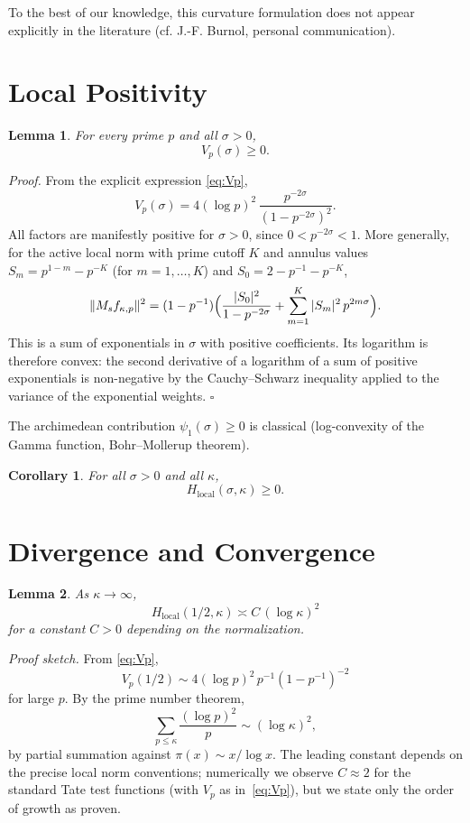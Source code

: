 \documentclass[11pt]{article}
\newtheorem*{lemma*}{Lemma}
\newtheorem*{corollary*}{Corollary}
\begin{document}
To the best of our knowledge, this curvature formulation does not appear explicitly in the literature (cf. J.-F. Burnol, personal communication).

\section{Local Positivity}

\begin{lemma*}
For every prime $p$ and all $\sigma>0$,
\[
V_p(\sigma)\ge 0.
\]
\end{lemma*}

\textit{Proof.} From the explicit expression \eqref{eq:Vp},
\[
V_p(\sigma)=4(\log p)^2\,\frac{p^{-2\sigma}}{(1-p^{-2\sigma})^2}.
\]
All factors are manifestly positive for $\sigma>0$, since $0<p^{-2\sigma}<1$. More generally, for the active local norm with prime cutoff $K$ and annulus values $S_m = p^{1-m}-p^{-K}$ (for $m=1,\ldots,K$) and $S_0 = 2-p^{-1}-p^{-K}$,
\[
\|M_s f_{\kappa,p}\|^2 = (1-p^{-1})\Bigl(\frac{|S_0|^2}{1-p^{-2\sigma}}+\sum_{m=1}^{K}|S_m|^2\,p^{2m\sigma}\Bigr).
\]
This is a sum of exponentials in $\sigma$ with positive coefficients. Its logarithm is therefore convex: the second derivative of a logarithm of a sum of positive exponentials is non-negative by the Cauchy--Schwarz inequality applied to the variance of the exponential weights. \hfill$\square$

The archimedean contribution $\psi_1(\sigma)\ge 0$ is classical (log-convexity of the Gamma function, Bohr--Mollerup theorem).

\begin{corollary*}
For all $\sigma>0$ and all $\kappa$,
\[
H_{\mathrm{local}}(\sigma,\kappa)\ge 0.
\]
\end{corollary*}

\section{Divergence and Convergence}

\begin{lemma*}
As $\kappa\to\infty$,
\[
H_{\mathrm{local}}(1/2,\kappa) \asymp C\, (\log \kappa)^2
\]
for a constant $C>0$ depending on the normalization.
\end{lemma*}

\textit{Proof sketch.} From \eqref{eq:Vp},
\[
V_p(1/2)\sim 4(\log p)^2\,p^{-1}(1-p^{-1})^{-2}
\]
for large $p$. By the prime number theorem,
\[
\sum_{p\le \kappa}\frac{(\log p)^2}{p}\sim (\log \kappa)^2,
\]
by partial summation against $\pi(x)\sim x/\log x$. The leading constant depends on the precise local norm conventions; numerically we observe $C\approx 2$ for the standard Tate test functions (with $V_p$ as in~\eqref{eq:Vp}), but we state only the order of growth as proven.
\end{document}
